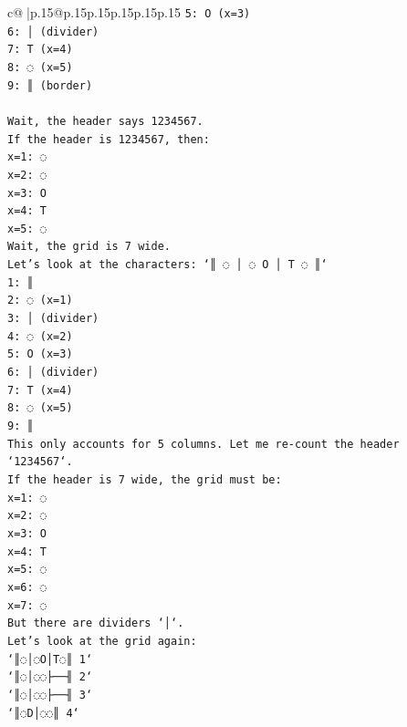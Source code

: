 \documentclass{article}
\begin{document}
{\begin{supertabular}{c@{$\;$}|p{.15\linewidth}@{}p{.15\linewidth}p{.15\linewidth}p{.15\linewidth}p{.15\linewidth}p{.15\linewidth}}
{{{\texttt{5: O (x=3)} \\
\texttt{6: │ (divider)} \\
\texttt{7: T (x=4)} \\
\texttt{8: ◌ (x=5)} \\
\texttt{9: ║ (border)} \\
\\ 
\texttt{Wait, the header says 1234567.} \\
\texttt{If the header is 1234567, then:} \\
\texttt{x=1: ◌} \\
\texttt{x=2: ◌} \\
\texttt{x=3: O} \\
\texttt{x=4: T} \\
\texttt{x=5: ◌} \\
\texttt{Wait, the grid is 7 wide.} \\
\texttt{Let's look at the characters: `║ ◌ │ ◌ O │ T ◌ ║`} \\
\texttt{1: ║} \\
\texttt{2: ◌ (x=1)} \\
\texttt{3: │ (divider)} \\
\texttt{4: ◌ (x=2)} \\
\texttt{5: O (x=3)} \\
\texttt{6: │ (divider)} \\
\texttt{7: T (x=4)} \\
\texttt{8: ◌ (x=5)} \\
\texttt{9: ║} \\
\texttt{This only accounts for 5 columns. Let me re{-}count the header `1234567`.} \\
\texttt{If the header is 7 wide, the grid must be:} \\
\texttt{x=1: ◌} \\
\texttt{x=2: ◌} \\
\texttt{x=3: O} \\
\texttt{x=4: T} \\
\texttt{x=5: ◌} \\
\texttt{x=6: ◌} \\
\texttt{x=7: ◌} \\
\texttt{But there are dividers `│`.} \\
\texttt{Let's look at the grid again:} \\
\texttt{`║◌│◌O│T◌║ 1`} \\
\texttt{`║◌│◌◌├──╢ 2`} \\
\texttt{`║◌│◌◌├──╢ 3`} \\
\texttt{`║◌D│◌◌║ 4`} \\
}}}
\end{supertabular}}
\end{document}
